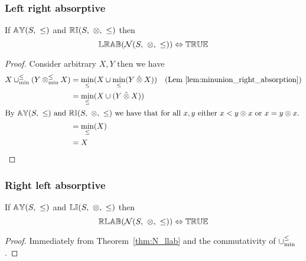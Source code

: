 \documentclass[../Summary.tex]{subfiles}
\begin{document}
\subsubsection{Left right absorptive}

\begin{theorem} \label{thm:N_lrab}
If ${\mathbb{AY}}(S,\ \leq)$ and ${\mathbb{RI}}(S,\ \otimes,\ \leq)$ then
\begin{equation*}
\propname{LRAB}(\mathcal{N}(S,\ \otimes,\ \leq)) \Leftrightarrow \propname{TRUE}
\end{equation*}
\end{theorem}

\begin{proof}

\vspace{0.5em}
Consider arbitrary $X, Y$ then we have
\begin{align*}
X \minunion (Y \minlift X) 	& = \min_\leq(X \cup \min_\leq(Y \lift X)) & \text{(Lem \ref{lem:minunion_right_absorption})} \\
							& = \min_\leq(X \cup (Y \lift X)) \\
\intertext{By $\propname{AY}(S,\ \leq)$ and $\propname{RI}(S,\ \otimes,\ \leq)$ we have that for all $x, y$ either $x < y \otimes x$ or $x = y \otimes x$.}
							& = \min_\leq(X) \\
							& = X
\end{align*}
\end{proof}





\subsubsection{Right left absorptive}

\begin{theorem} \label{thm:N_rlab}
If ${\mathbb{AY}}(S,\ \leq)$ and ${\mathbb{LI}}(S,\ \otimes,\ \leq)$ then
\begin{equation*}
\propname{RLAB}(\mathcal{N}(S,\ \otimes,\ \leq)) \Leftrightarrow \propname{TRUE}
\end{equation*}
\end{theorem}


\begin{proof}

\vspace{0.5em}
Immediately from Theorem~\ref{thm:N_llab} and the commutativity of $\mathbin{\cup_{\min}^{\leq}}$.
\end{proof}
\end{document}
